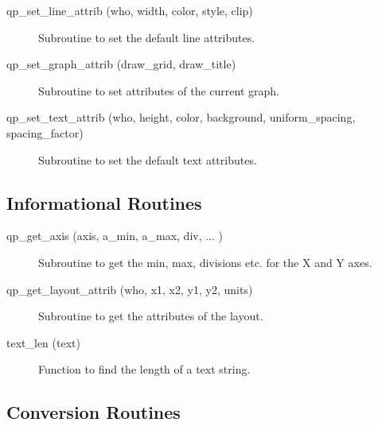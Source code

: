 \begin{description}
\item[qp\_set\_line\_attrib (who, width, color, style, clip)] \Newline 
     Subroutine to set the default line attributes.

\item[qp\_set\_graph\_attrib (draw\_grid, draw\_title)] \Newline 
     Subroutine to set attributes of the current graph.

\item[qp\_set\_text\_attrib (who, height, color, background, 
                                uniform\_spacing, spacing\_factor) ] \Newline 
     Subroutine to set the default text attributes.

\end{description}

\subsection{Informational Routines}

\begin{description}

\item[qp\_get\_axis (axis, a\_min, a\_max, div, ... ) ] \Newline
     Subroutine to get the min, max, divisions etc. for the X and Y axes.

\item[qp\_get\_layout\_attrib (who, x1, x2, y1, y2, units)] \Newline 
     Subroutine to get the attributes of the layout.

\item[text\_len (text)] \Newline 
     Function to find the length of a text string.

\end{description}

\subsection{Conversion Routines}

